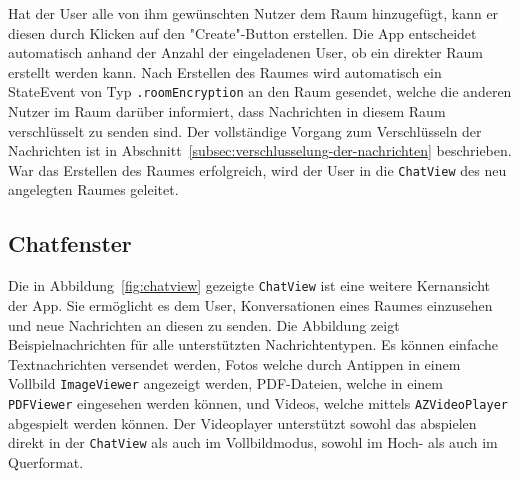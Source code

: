     Hat der User alle von ihm gewünschten Nutzer dem Raum hinzugefügt, kann er diesen durch Klicken auf den "Create"-Button erstellen.
    Die App entscheidet automatisch anhand der Anzahl der eingeladenen User, ob ein direkter Raum erstellt werden kann.
    Nach Erstellen des Raumes wird automatisch ein StateEvent von Typ \texttt{.roomEncryption} an den Raum gesendet, welche die anderen Nutzer im Raum darüber informiert, dass Nachrichten in diesem Raum verschlüsselt zu senden sind.
    Der vollständige Vorgang zum Verschlüsseln der Nachrichten ist in Abschnitt~\ref{subsec:verschlusselung-der-nachrichten} beschrieben.
    War das Erstellen des Raumes erfolgreich, wird der User in die \texttt{ChatView} des neu angelegten Raumes geleitet.

    \newpage
    \subsection{Chatfenster}
    Die in Abbildung~\ref{fig:chatview} gezeigte \texttt{ChatView} ist eine weitere Kernansicht der App.
    Sie ermöglicht es dem User, Konversationen eines Raumes einzusehen und neue Nachrichten an diesen zu senden.
    Die Abbildung zeigt Beispielnachrichten für alle unterstützten Nachrichtentypen.
    Es können einfache Textnachrichten versendet werden, Fotos welche durch Antippen in einem Vollbild \texttt{ImageViewer} angezeigt werden,
    PDF-Dateien, welche in einem \texttt{PDFViewer} eingesehen werden können, und Videos, welche mittels \texttt{AZVideoPlayer} abgespielt werden können.
    Der Videoplayer unterstützt sowohl das abspielen direkt in der \texttt{ChatView} als auch im Vollbildmodus, sowohl im Hoch- als auch im Querformat.

